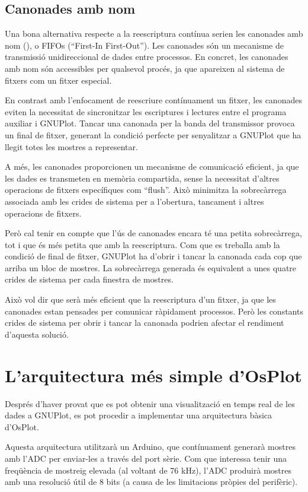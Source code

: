 \documentclass{tfgitic}[2023/06/30]
\begin{document}
\subsection{Canonades amb nom}

Una bona alternativa respecte a la reescriptura contínua serien les
canonades amb nom (\cite[``Named Pipes'']{canonades-nom}), o FIFOs
(``First-In First-Out''). Les canonades són un mecanisme de
transmissió unidireccional de dades entre processos. En concret, les
canonades amb nom són accessibles per qualsevol procés, ja que
apareixen al sistema de fitxers com un fitxer especial.

En contrast amb l'enfocament de reescriure contínuament un fitxer, les
canonades eviten la necessitat de sincronitzar les escriptures i
lectures entre el programa auxiliar i GNUPlot. Tancar una canonada per
la banda del transmissor provoca un final de fitxer, generant la
condició perfecte per senyalitzar a GNUPlot que ha llegit totes les
mostres a representar.

A més, les canonades proporcionen un mecanisme de comunicació
eficient, ja que les dades es transmeten en memòria compartida, sense
la necessitat d'altres operacions de fitxers específiques com
``flush''. Això minimitza la sobrecàrrega associada amb les crides de
sistema per a l'obertura, tancament i altres operacions de fitxers.

Però cal tenir en compte que l'ús de canonades encara té una petita
sobrecàrrega, tot i que és més petita que amb la reescriptura.  Com
que es treballa amb la condició de final de fitxer, GNUPlot ha d'obrir
i tancar la canonada cada cop que arriba un bloc de mostres. La
sobrecàrrega generada és equivalent a unes quatre crides de sistema
per cada finestra de mostres.

Això vol dir que serà més eficient que la reescriptura d'un fitxer, ja
que les canonades estan pensades per comunicar ràpidament
processos. Però les constants crides de sistema per obrir i tancar la
canonada podrien afectar el rendiment d'aquesta solució.

\section{L'arquitectura més simple d'OsPlot}

Després d'haver provat que es pot obtenir una visualització en temps
real de les dades a GNUPlot, es pot procedir a implementar una
arquitectura bàsica d'OsPlot.

Aquesta arquitectura utilitzarà un Arduino, que contínuament generarà
mostres amb l'ADC per enviar-les a través del port sèrie. Com que
interessa tenir una freqüència de mostreig elevada (al voltant de 76
kHz), l'ADC produirà mostres amb una resolució útil de 8 bits (a causa
de les limitacions pròpies del perifèric).
\end{document}
